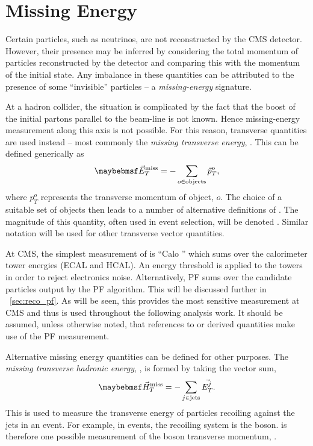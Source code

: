 \section{Missing Energy}
Certain particles, such as neutrinos, are not reconstructed by the \ac{CMS}
detector. However, their presence may be inferred by considering the total
momentum of particles reconstructed by the detector and comparing this with the
momentum of the initial state. Any imbalance in these quantities can be
attributed to the presence of some ``invisible'' particles -- a
\emph{missing-energy} signature.

At a hadron collider, the situation is complicated by the fact that the boost of
the initial partons parallel to the beam-line is not known. Hence missing-energy
measurement along this axis is not possible. For this reason, transverse
quantities are used instead -- most commonly the \emph{missing transverse
  energy}, \METv. This can be defined generically as
\begin{equation*}
\METv = -\sum_{o \in \textrm{objects}} \vec{p}_T^o,
\end{equation*}
where $p_T^o$ represents the transverse momentum of object, $o$. The choice of a
suitable set of objects then leads to a number of alternative definitions of
\METv. The magnitude of this quantity, often used in event selection, will be
denoted \MET. Similar notation will be used for other transverse vector
quantities.

At \ac{CMS}, the simplest measurement of \METv is ``\ac{Calo} \METv'' which sums
over the calorimeter tower energies (\ac{ECAL} and \ac{HCAL}).  An energy
threshold is applied to the towers in order to reject electronics
noise. Alternatively, \ac{PF} \METv sums over the candidate particles output by
the \ac{PF} algorithm. This will be discussed further in
\sec~\ref{sec:reco_pf}. As will be seen, this provides the most sensitive \METv
measurement at \ac{CMS} and thus is used throughout the following analysis
work. It should be assumed, unless otherwise noted, that references to \METv or
derived quantities make use of the \ac{PF} measurement.

Alternative missing energy quantities can be defined for other purposes. The
\emph{missing transverse hadronic energy}, \MHT, is formed by taking the vector
sum,
\begin{equation*}
\MHTv = -\sum_{j \in \textrm{jets}} \vec{E_T^j}.
\end{equation*}
This is used to measure the transverse energy of particles recoiling against the
jets in an event. For example, in \Wjets events, the recoiling system is the \PW
boson. \MHTv is therefore one possible measurement of the \PW boson transverse
momentum, \PtWv.


